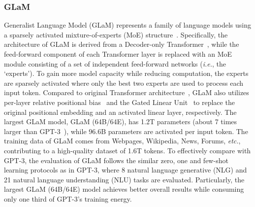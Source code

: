 \subsubsection{GLaM~\cite{du2022glam}}
Generalist Language Model (GLaM) represents a family of language models using a sparsely activated mixture-of-experts (MoE) structure~\cite{shazeer2017outrageously,fedus2022switch}. Specifically, the architecture of GLaM is derived from a Decoder-only Transformer~\cite{Transformers}, while the feed-forward component of each Transformer layer is replaced with an MoE module consisting of a set of independent feed-forward networks (\emph{i.e.}, the `experts'). To gain more model capacity while reducing computation, the experts are sparsely activated where only the best two experts are used to process each input token. Compared to original Transformer architecture~\cite{Transformers}, GLaM also utilizes per-layer relative positional bias~\cite{dai2019transformer} and the Gated Linear Unit~\cite{shazeer2020glu} to replace the original positional embedding and an activated linear layer, respectively. The largest GLaM model, GLaM (64B/64E), has 1.2T parameters (about 7 times larger than GPT-3~\cite{GPT-3}), while 96.6B parameters are activated per input token. The training data of GLaM comes from Webpages, Wikipedia, News, Forums, \emph{etc.}, contributing to a high-quality dataset of 1.6T tokens. To effectively compare with GPT-3, the evaluation of GLaM follows the similar zero, one and few-shot learning protocols as in GPT-3, where 8 natural language generative (NLG) and 21 natural language understanding (NLU) tasks are evaluated. Particularly, the largest GLaM (64B/64E) model achieves better overall results while consuming only one third of GPT-3's training energy.

